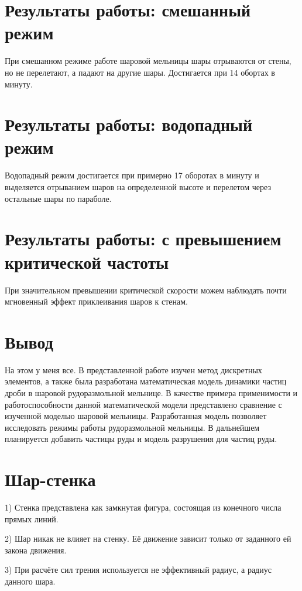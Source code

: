 \documentclass[a4paper]{article}
\begin{document}
\section{Результаты работы: смешанный режим}

При смешанном режиме работе шаровой мельницы шары отрываются от стены, но не перелетают, а падают на другие шары. Достигается при 14 обортах в минуту.

\section{Результаты работы: водопадный режим}

Водопадный режим достигается при примерно 17 оборотах в минуту и выделяется отрыванием шаров на определенной высоте и перелетом через остальные шары по параболе.

\section{Результаты работы: с превышением критической частоты}

При значительном превышении критической скорости можем наблюдать почти мгновенный эффект приклеивания шаров к стенам.

\section{Вывод}

На этом у меня все.
В представленной работе изучен метод дискретных элементов, а также была разработана математическая модель динамики частиц дроби в шаровой рудоразмольной мельнице.
В качестве примера применимости и работоспособности данной математической модели представлено сравнение с изученной моделью шаровой мельницы.
Разработанная модель позволяет исследовать режимы работы рудоразмольной мельницы.
В дальнейшем планируется добавить частицы руды и модель разрушения для частиц руды.


\section{Шар-стенка}

1) Стенка представлена как замкнутая фигура, состоящая из конечного числа прямых линий.

2) Шар никак не влияет на стенку. 
Её движение зависит только от заданного ей закона движения.

3) При расчёте сил трения используется не эффективный радиус, а радиус данного шара.
\end{document}
